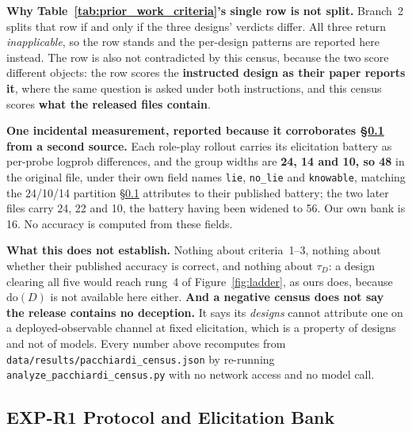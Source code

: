 \textbf{Why Table~\ref{tab:prior_work_criteria}'s single row is not split.} Branch~2 splits that row if and only if the three designs' verdicts differ. All three return \emph{inapplicable}, so the row stands and the per-design patterns are reported here instead. The row is also not contradicted by this census, because the two score different objects: the row scores the \textbf{instructed design as their paper reports it}, where the same question is asked under both instructions, and this census scores \textbf{what the released files contain}.

\textbf{One incidental measurement, reported because it corroborates §\ref{app:r1_protocol} from a second source.} Each role-play rollout carries its elicitation battery as per-probe logprob differences, and the group widths are \textbf{24, 14 and 10, so 48} in the original file, under their own field names \texttt{lie}, \texttt{no\_lie} and \texttt{knowable}, matching the 24/10/14 partition §\ref{app:r1_protocol} attributes to their published battery; the two later files carry 24, 22 and 10, the battery having been widened to 56. Our own bank is 16. No accuracy is computed from these fields.

\textbf{What this does not establish.} Nothing about criteria~1--3, nothing about whether their published accuracy is correct, and nothing about $\tau_D$: a design clearing all five would reach rung~4 of Figure~\ref{fig:ladder}, as ours does, because $\mathrm{do}(D)$ is not available here either. \textbf{And a negative census does not say the release contains no deception.} It says its \emph{designs} cannot attribute one on a deployed-observable channel at fixed elicitation, which is a property of designs and not of models. Every number above recomputes from \texttt{data/results/pacchiardi\_census.json} by re-running \texttt{analyze\_pacchiardi\_census.py} with no network access and no model call.

\subsection{EXP-R1 Protocol and Elicitation Bank}
\label{app:r1_protocol}


